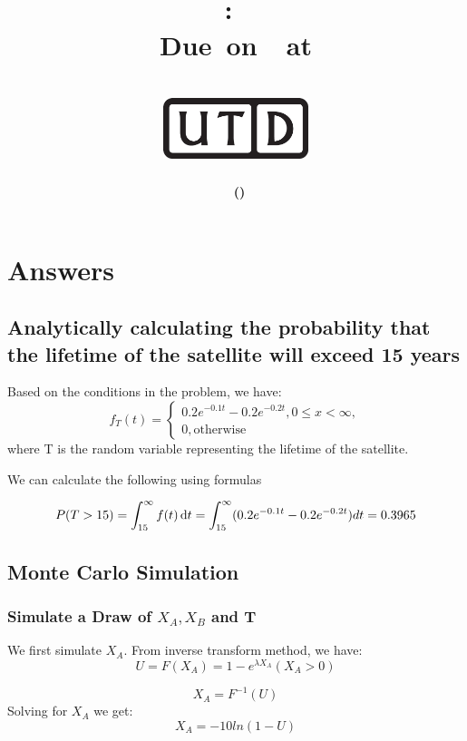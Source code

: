 \documentclass[12pt,letterpaper,titlepage,en-US]{article}
\title{
    \vspace{1in}
    \textmd{\textbf{\hmwkClassName \\\hmwkClass:\ \hmwkTitle }}\\
     \normalsize\vspace{0.1in}\small{Due\ on\ \DTMusedate{DueDate}\ at \DTMusetime{DueDate} }\\
    \vspace{0.1in}\large{\textit{\hmwkClassInstructor}}\\
    \vspace{0.5in}\includegraphics[height=2.4em]{UTD_logo_BW}\\
    \vspace{2in}
    }
\author{\textbf{\hmwkAuthorName\ \footnotesize{(\hmwkAuthorNetID)}} \\ }
\date{}
\begin{document}
\maketitle


\tableofcontents

\pagebreak
{}


\section{Answers}

\subsection{Analytically calculating the probability that the lifetime of the satellite will exceed 15 years}
Based on the conditions in the problem, we have:
\begin{equation}
f_{T}(t) = \begin{cases} 0.2 e^{-0.1t} - 0.2 e^{-0.2t}, 0 \leq x < \infty,\\ 0, \text{otherwise} \end{cases}
\end{equation}
where T is the random variable representing the lifetime of the satellite.

We can calculate the following using formulas

\begin{equation}
P(T > 15) =\int_{15}^\infty f(t) \mathop{}\!\mathrm{d} t\\
     =\int_{15}^\infty (0.2 e^{-0.1t} - 0.2 e^{-0.2t})dt \\
     = 0.3965
\end{equation}


\subsection{Monte Carlo Simulation}

\subsubsection{Simulate a Draw of $X_{A}, X_{B}$ and T}
We first simulate $X_{A}.$ From inverse transform method, we have:
\begin{equation}
U = F(X_{A}) =1 - e^{\lambda X_{A}} (X_{A}>0) 
\end{equation}


\begin{equation}
X_{A} = F^{-1}(U)
\end{equation}
Solving for $X_{A}$ we get:
\begin{equation}
X_{A} = -10 ln(1-U)
\end{equation}
\end{document}
